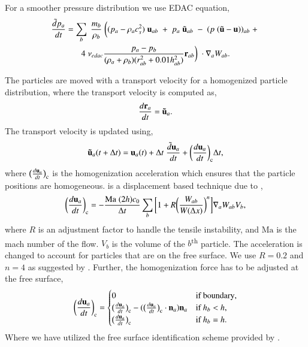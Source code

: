 For a smoother pressure distribution we use EDAC equation,
\begin{multline}
  \label{eq:sph-discretization-edac}
  \frac{\tilde{d}p_a}{dt} = \sum_{b} \; \frac{m_b}{\rho_{b}} \; \bigg(
  (p_{a} - \rho_{a} c_{s}^2) \; \mathbf{u}_{ab} \; + \;
  p_{a} \; \tilde{\mathbf{u}}_{ab} \; - \;
  (p \; (\tilde{\mathbf{u}} - \mathbf{u}))_{ab} \; + \; \\
  4 \; \nu_{edac}
  \frac{p_a - p_b}{(\rho_a + \rho_b) (r^2_{ab} + 0.01 h_{ab}^{2})} \mathbf{r}_{ab}
  \bigg) \; \cdot \nabla_{a} W_{ab}.
\end{multline}

The particles are moved with a transport velocity for a homogenized particle
distribution, where the transport velocity is computed as,
\begin{equation}
  \label{eq:transport_velocity_position_derivative}
  \frac{d\mathbf{r}_a}{dt} = \mathbf{\tilde{u}}_a.
\end{equation}
%
The transport velocity is updated using,
\begin{equation}
  \label{eq:transport_velocity}
  \mathbf{\tilde{u}}_a(t + \Delta t) =\mathbf{u}_a(t) + \Delta t \; \frac{\tilde{d} \mathbf{u}_a}{dt} +
  \bigg(\frac{d \mathbf{u}_{a}}{dt}\bigg)_{\text{c}} \Delta t,
\end{equation}
%
where $\big(\frac{d \mathbf{u}_a}{dt}\big)_{\text{c}}$ is the homogenization
acceleration which ensures that the particle positions are homogeneous.
is a displacement based technique due to \cite{sun2017deltaplus},
\begin{equation}
  \label{eq:sun2019_pst}
  \bigg(\frac{d \mathbf{u}_a}{dt}\bigg)_{\text{c}} = - \frac{\text{Ma} \;
    (2h) c_0}{\Delta t} \sum_b \bigg[1 + R \bigg( \frac{W_{ab}}{W(\Delta x)} \bigg)^n
  \bigg] \nabla_a W_{ab} V_b,
\end{equation}
where $R$ is an adjustment factor to handle the tensile instability, and
$\text{Ma}$ is the mach number of the flow. $V_b$ is the volume of the
$b$\textsuperscript{th} particle. The acceleration is changed to account for
particles that are on the free surface. We use $R = 0.2$ and $n = 4$ as
suggested by \cite{sun_consistent_2019}. Further, the homogenization force
has to be adjusted at the free surface,
\begin{equation}
 \label{eq:shifting_force_free_surface_adjust_sun2019}
 \bigg(\frac{d \mathbf{u}_a}{dt}\bigg)_{\text{c}} =\begin{cases}
   0& \text{if boundary},\\
   \big(\frac{d \mathbf{u}_a}{dt}\big)_{\text{c}}  - (\big(\frac{d \mathbf{u}_a}{dt}\big)_{\text{c}} \cdot \mathbf{n}_a) \mathbf{n}_a& \text{if $h_b < h$},\\
   \big(\frac{d \mathbf{u}_a}{dt}\big)_{\text{c}}& \text{if $h_b = h$}.
 \end{cases}
\end{equation}
Where we have utilized the free surface identification scheme provided by \citep{adepu2021corrected}.

